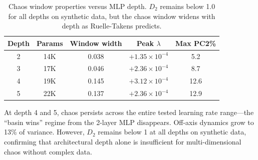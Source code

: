 \documentclass[aps,prl,twocolumn,superscriptaddress]{revtex4-2}
\begin{document}
\begin{table}[h]
\caption{\label{tab:depth}%
Chaos window properties versus MLP depth. $D_2$ remains below 1.0 for all depths on synthetic data, but the chaos window widens with depth as Ruelle-Takens predicts.}
\begin{ruledtabular}
\begin{tabular}{ccccc}
Depth & Params & Window width & Peak $\lambda$ & Max PC2\%\\
\hline
2 & 14K & 0.038 & $+1.35 \times 10^{-4}$ & 5.2\\
3 & 17K & 0.046 & $+2.36 \times 10^{-4}$ & 8.7\\
4 & 19K & 0.145 & $+3.12 \times 10^{-4}$ & 12.6\\
5 & 22K & 0.137 & $+2.36 \times 10^{-4}$ & 12.9\\
\end{tabular}
\end{ruledtabular}
\end{table}

At depth 4 and 5, chaos persists across the entire tested learning rate range---the ``basin wins'' regime from the 2-layer MLP disappears. Off-axis dynamics grow to 13\% of variance. However, $D_2$ remains below 1 at all depths on synthetic data, confirming that architectural depth alone is insufficient for multi-dimensional chaos without complex data.
\end{document}
